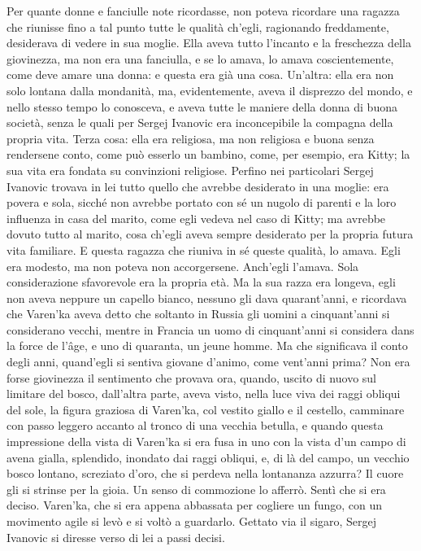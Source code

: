 Per quante donne e fanciulle note ricordasse, non poteva ricordare una ragazza che riunisse fino a tal punto tutte le qualità ch'egli, ragionando freddamente, desiderava di vedere in sua moglie. Ella aveva tutto l'incanto e la freschezza della giovinezza, ma non era una fanciulla, e se lo amava, lo amava coscientemente, come deve amare una donna: e questa era già una cosa. Un'altra: ella era non solo lontana dalla mondanità, ma, evidentemente, aveva il disprezzo del mondo, e nello stesso tempo lo conosceva, e aveva tutte le maniere della donna di buona società, senza le quali per Sergej Ivanovic era inconcepibile la compagna della propria vita. Terza cosa: ella era religiosa, ma non religiosa e buona senza rendersene conto, come può esserlo un bambino, come, per esempio, era Kitty; la sua vita era fondata su convinzioni religiose. Perfino nei particolari Sergej Ivanovic trovava in lei tutto quello che avrebbe desiderato in una moglie: era povera e sola, sicché non avrebbe portato con sé un nugolo di parenti e la loro influenza in casa del marito, come egli vedeva nel caso di Kitty; ma avrebbe dovuto tutto al marito, cosa ch'egli aveva sempre desiderato per la propria futura vita familiare. E questa ragazza che riuniva in sé queste qualità, lo amava. Egli era modesto, ma non poteva non accorgersene. Anch'egli l'amava. Sola considerazione sfavorevole era la propria età. Ma la sua razza era longeva, egli non aveva neppure un capello bianco, nessuno gli dava quarant'anni, e ricordava che Varen'ka aveva detto che soltanto in Russia gli uomini a cinquant'anni si considerano vecchi, mentre in Francia un uomo di cinquant'anni si considera dans la force de l'âge, e uno di quaranta, un jeune homme. Ma che significava il conto degli anni, quand'egli si sentiva giovane d'animo, come vent'anni prima? Non era forse giovinezza il sentimento che provava ora, quando, uscito di nuovo sul limitare del bosco, dall'altra parte, aveva visto, nella luce viva dei raggi obliqui del sole, la figura graziosa di Varen'ka, col vestito giallo e il cestello, camminare con passo leggero accanto al tronco di una vecchia betulla, e quando questa impressione della vista di Varen'ka si era fusa in uno con la vista d'un campo di avena gialla, splendido, inondato dai raggi obliqui, e, di là del campo, un vecchio bosco lontano, screziato d'oro, che si perdeva nella lontananza azzurra? Il cuore gli si strinse per la gioia. Un senso di commozione lo afferrò. Sentì che si era deciso. Varen'ka, che si era appena abbassata per cogliere un fungo, con un movimento agile si levò e si voltò a guardarlo. Gettato via il sigaro, Sergej Ivanovic si diresse verso di lei a passi decisi. 

